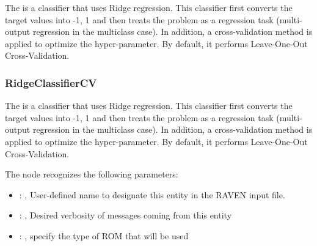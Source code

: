  The  is a classifier that uses Ridge regression.
 This classifier first converts the target values into {-1, 1} and then treats
 the problem as a regression task (multi-output regression in the multiclass case).
 In addition, a cross-validation method is applied to optimize the hyper-parameter.
 By default, it performs Leave-One-Out Cross-Validation.

\subsubsection{RidgeClassifierCV}
  The  is a classifier that uses Ridge regression.
  This classifier first converts the target values into {-1, 1} and then treats
  the problem as a regression task (multi-output regression in the multiclass case).
  In addition, a cross-validation method is applied to optimize the hyper-parameter.
  By default, it performs Leave-One-Out Cross-Validation.

  The  node recognizes the following parameters:
    \begin{itemize}
      \item {}: , 
        User-defined name to designate this entity in the RAVEN input file.
      \item {}: , 
        Desired verbosity of messages coming from this entity
      \item {}: , 
        specify the type of ROM that will be used
  \end{itemize}

